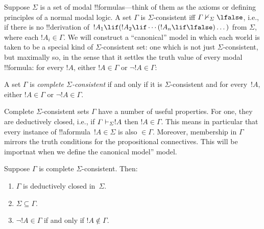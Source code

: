 \documentclass[../../../include/open-logic-section]{subfiles}
\begin{document}


Suppose $\Sigma$ is a set of modal !!{formula}s---think of them as the
axioms or defining principles of a normal modal logic. A set $\Gamma$
is $\Sigma$-consistent iff $\Gamma \Proves/[\Sigma] \lfalse$, i.e., if
there is no !!{derivation} of~$!A_1 \lif (!A_2 \lif \cdots (!A_n \lif
\lfalse)\dots)$ from $\Sigma$, where each $!A_i \in \Gamma$. We will
construct a ``canonical'' model in which each world is taken to be a
special kind of $\Sigma$-consistent set: one which is not just
$\Sigma$-consistent, but maximally so, in the sense that it settles
the truth value of every modal !!{formula}: for every $!A$, either $!A
\in \Gamma$ or $\lnot !A \in \Gamma$:

\begin{defn}
  A set $\Gamma$ is \emph{complete $\Sigma$-consistent} if and
  only if it is $\Sigma$-consistent and for every~$!A$, either
  $!A \in \Gamma$ or $\lnot !A \in \Gamma$.
\end{defn}

Complete $\Sigma$-consistent sets $\Gamma$ have a number of useful
properties. For one, they are deductively closed, i.e., if $\Gamma
\Proves[\Sigma] !A$ then $!A \in \Gamma$. This means in particular
that every instance of !!a{formula}~$!A \in \Sigma$ is also $\in
\Gamma$. Moreover, membership in $\Gamma$ mirrors the truth conditions
for the propositional connectives. This will be importnat when we
define the canonical model'' model.

\begin{prop}
  Suppose $\Gamma$ is complete $\Sigma$-consistent. Then:
  \begin{enumerate}
  \item {}%
    $\Gamma$ is deductively closed in~$\Sigma$.
  \item {}%
    $\Sigma \subseteq \Gamma$.
  \item {}%
    $\lnot!A \in \Gamma$ if and only if $!A \notin
    \Gamma$.
  \end{enumerate}
\end{prop}
\end{document}

